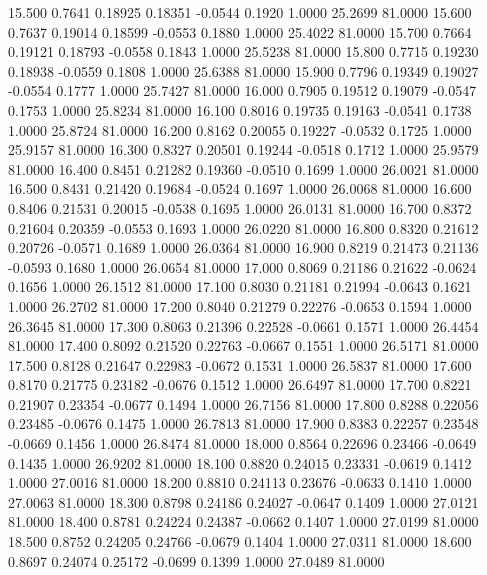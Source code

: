   15.500   0.7641   0.18925   0.18351  -0.0544   0.1920   1.0000  25.2699  81.0000
  15.600   0.7637   0.19014   0.18599  -0.0553   0.1880   1.0000  25.4022  81.0000
  15.700   0.7664   0.19121   0.18793  -0.0558   0.1843   1.0000  25.5238  81.0000
  15.800   0.7715   0.19230   0.18938  -0.0559   0.1808   1.0000  25.6388  81.0000
  15.900   0.7796   0.19349   0.19027  -0.0554   0.1777   1.0000  25.7427  81.0000
  16.000   0.7905   0.19512   0.19079  -0.0547   0.1753   1.0000  25.8234  81.0000
  16.100   0.8016   0.19735   0.19163  -0.0541   0.1738   1.0000  25.8724  81.0000
  16.200   0.8162   0.20055   0.19227  -0.0532   0.1725   1.0000  25.9157  81.0000
  16.300   0.8327   0.20501   0.19244  -0.0518   0.1712   1.0000  25.9579  81.0000
  16.400   0.8451   0.21282   0.19360  -0.0510   0.1699   1.0000  26.0021  81.0000
  16.500   0.8431   0.21420   0.19684  -0.0524   0.1697   1.0000  26.0068  81.0000
  16.600   0.8406   0.21531   0.20015  -0.0538   0.1695   1.0000  26.0131  81.0000
  16.700   0.8372   0.21604   0.20359  -0.0553   0.1693   1.0000  26.0220  81.0000
  16.800   0.8320   0.21612   0.20726  -0.0571   0.1689   1.0000  26.0364  81.0000
  16.900   0.8219   0.21473   0.21136  -0.0593   0.1680   1.0000  26.0654  81.0000
  17.000   0.8069   0.21186   0.21622  -0.0624   0.1656   1.0000  26.1512  81.0000
  17.100   0.8030   0.21181   0.21994  -0.0643   0.1621   1.0000  26.2702  81.0000
  17.200   0.8040   0.21279   0.22276  -0.0653   0.1594   1.0000  26.3645  81.0000
  17.300   0.8063   0.21396   0.22528  -0.0661   0.1571   1.0000  26.4454  81.0000
  17.400   0.8092   0.21520   0.22763  -0.0667   0.1551   1.0000  26.5171  81.0000
  17.500   0.8128   0.21647   0.22983  -0.0672   0.1531   1.0000  26.5837  81.0000
  17.600   0.8170   0.21775   0.23182  -0.0676   0.1512   1.0000  26.6497  81.0000
  17.700   0.8221   0.21907   0.23354  -0.0677   0.1494   1.0000  26.7156  81.0000
  17.800   0.8288   0.22056   0.23485  -0.0676   0.1475   1.0000  26.7813  81.0000
  17.900   0.8383   0.22257   0.23548  -0.0669   0.1456   1.0000  26.8474  81.0000
  18.000   0.8564   0.22696   0.23466  -0.0649   0.1435   1.0000  26.9202  81.0000
  18.100   0.8820   0.24015   0.23331  -0.0619   0.1412   1.0000  27.0016  81.0000
  18.200   0.8810   0.24113   0.23676  -0.0633   0.1410   1.0000  27.0063  81.0000
  18.300   0.8798   0.24186   0.24027  -0.0647   0.1409   1.0000  27.0121  81.0000
  18.400   0.8781   0.24224   0.24387  -0.0662   0.1407   1.0000  27.0199  81.0000
  18.500   0.8752   0.24205   0.24766  -0.0679   0.1404   1.0000  27.0311  81.0000
  18.600   0.8697   0.24074   0.25172  -0.0699   0.1399   1.0000  27.0489  81.0000
